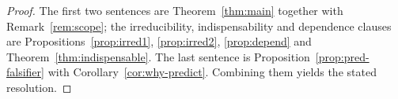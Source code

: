 \documentclass{amsart}
\theoremstyle{definition}
\theoremstyle{plain}
\begin{document}
\begin{proof}
The first two sentences are Theorem~\ref{thm:main} together with
Remark~\ref{rem:scope}; the irreducibility, indispensability and dependence
clauses are Propositions~\ref{prop:irred1}, \ref{prop:irred2},
\ref{prop:depend} and Theorem~\ref{thm:indispensable}. The last sentence is
Proposition~\ref{prop:pred-falsifier} with Corollary~\ref{cor:why-predict}.
Combining them yields the stated resolution.
\end{proof}
\end{document}
